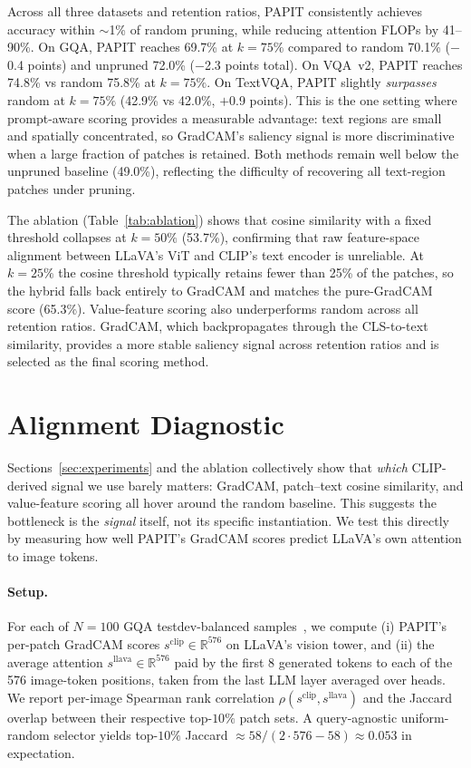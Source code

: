 \documentclass[10pt,twocolumn,letterpaper]{article}
\begin{document}
Across all three datasets and retention ratios, PAPIT consistently
achieves accuracy within $\sim$1\% of random pruning, while reducing
attention FLOPs by 41--90\%.
On GQA, PAPIT reaches 69.7\% at $k{=}75\%$ compared to random 70.1\%
($-$0.4 points) and unpruned 72.0\% ($-$2.3 points total).
On VQA~v2, PAPIT reaches 74.8\% vs random 75.8\% at $k{=}75\%$.
On TextVQA, PAPIT slightly \emph{surpasses} random at $k{=}75\%$
(42.9\% vs 42.0\%, $+$0.9 points).
This is the one setting where prompt-aware scoring provides a measurable
advantage: text regions are small and spatially concentrated, so GradCAM's
saliency signal is more discriminative when a large fraction of patches is
retained.
Both methods remain well below the unpruned baseline (49.0\%),
reflecting the difficulty of recovering all text-region patches under pruning.

The ablation (Table~\ref{tab:ablation}) shows that cosine similarity
with a fixed threshold collapses at $k{=}50\%$ (53.7\%), confirming
that raw feature-space alignment between LLaVA's ViT and CLIP's text
encoder is unreliable.
At $k{=}25\%$ the cosine threshold typically retains fewer than 25\%
of the patches, so the hybrid falls back entirely to GradCAM and
matches the pure-GradCAM score (65.3\%).
Value-feature scoring also underperforms random across all retention
ratios.
GradCAM, which backpropagates through the CLS-to-text similarity,
provides a more stable saliency signal across retention ratios and is
selected as the final scoring method.

\section{Alignment Diagnostic}
\label{sec:diagnostic}

Sections~\ref{sec:experiments} and the ablation collectively show that
\emph{which} CLIP-derived signal we use barely matters: GradCAM,
patch--text cosine similarity, and value-feature scoring all hover
around the random baseline. This suggests the bottleneck is the
\emph{signal} itself, not its specific instantiation. We test this
directly by measuring how well PAPIT's GradCAM scores predict
LLaVA's own attention to image tokens.

\paragraph{Setup.}
For each of $N{=}100$ GQA testdev-balanced
samples~\cite{hudson2019gqa}, we compute (i) PAPIT's per-patch
GradCAM scores $s^{\text{clip}}\in\mathbb{R}^{576}$ on LLaVA's vision
tower, and (ii) the average attention $s^{\text{llava}}\in\mathbb{R}^{576}$
paid by the first 8 generated tokens to each of the 576 image-token
positions, taken from the last LLM layer averaged over heads. We
report per-image Spearman rank correlation $\rho(s^{\text{clip}},
s^{\text{llava}})$ and the Jaccard overlap between their respective
top-$10\%$ patch sets. A query-agnostic uniform-random selector
yields top-$10\%$ Jaccard $\approx 58/(2\!\cdot\!576-58) \approx 0.053$
in expectation.
\end{document}
